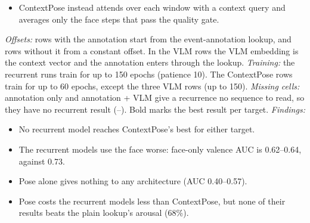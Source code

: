 \documentclass[11pt]{article}
\begin{document}
\begin{table}[!htbp]
{\begin{itemize}
  \item ContextPose instead attends over each window with a context query and averages only the face steps that pass the quality gate.
\end{itemize}
\emph{Offsets:} rows with the annotation start from the event-annotation lookup, and rows without it from a constant offset. In the VLM rows the VLM embedding is the context vector and the annotation enters through the lookup.
\emph{Training:} the recurrent runs train for up to 150 epochs (patience 10). The ContextPose rows train for up to 60 epochs, except the three VLM rows (up to 150).
\emph{Missing cells:} annotation only and annotation + VLM give a recurrence no sequence to read, so they have no recurrent result (--). Bold marks the best result per target.
\emph{Findings:}
\begin{itemize}
  \item No recurrent model reaches ContextPose's best for either target.
  \item The recurrent models use the face worse: face-only valence AUC is 0.62--0.64, against 0.73.
  \item Pose alone gives nothing to any architecture (AUC 0.40--0.57).
  \item Pose costs the recurrent models less than ContextPose, but none of their results beats the plain lookup's arousal (68\%).
\end{itemize}}
\end{table}

\clearpage
\end{document}
